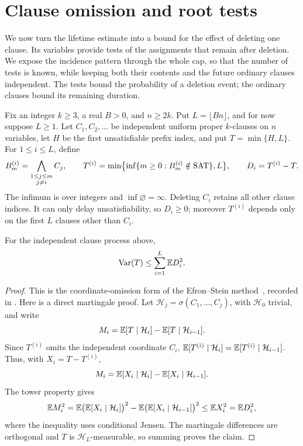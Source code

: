 \section{Clause omission and root tests}
\label{sec:deletion}

We now turn the lifetime estimate into a bound for the effect of
deleting one clause.  Its variables provide tests of the assignments
that remain after deletion.  We expose the incidence pattern through
the whole cap, so that the number of tests is known, while keeping
both their contents and the future ordinary clauses independent.
The tests bound the probability of a deletion event; the ordinary
clauses bound its remaining duration.

Fix an integer \(k\ge3\), a real \(B>0\), and \(n\ge2k\).  Put
\(L=\lfloor Bn\rfloor\), and for now suppose \(L\ge1\).
Let \(C_1,C_2,\ldots\) be independent uniform proper \(k\)-clauses
on \(n\) variables, let \(H\) be the first unsatisfiable prefix index,
and put \(T=\min\{H,L\}\).  For \(1\le i\le L\), define
\[
 B_m^{(i)}=\bigwedge_{\substack{1\le j\le m\\j\ne i}}C_j,\qquad
 T^{(i)}=\min\bigl\{\inf\{m\ge0:B_m^{(i)}\notin\mathrm{SAT}\},L\bigr\},
 \qquad D_i=T^{(i)}-T.
\]
The infimum is over integers and \(\inf\varnothing=\infty\).
Deleting \(C_i\) retains all other clause indices.  It can only delay
unsatisfiability, so \(D_i\ge0\); moreover \(T^{(i)}\) depends only
on the first \(L\) clauses other than \(C_i\).

\begin{lemma}\label{lem:coordinate-omission}
For the independent clause process above,
\begin{equation}\label{eq:coordinate-omission}
 \operatorname{Var}(T)\le\sum_{i=1}^{L}\mathbb E D_i^2.
\end{equation}
\end{lemma}

\begin{proof}
This is the coordinate-omission form of the Efron--Stein
method~\cite{EfronStein}, recorded in
\cite[equation~(3.6)]{BBLM}.  Here is a direct martingale proof.
Let \(\mathcal H_j=\sigma(C_1,\ldots,C_j)\), with \(\mathcal H_0\)
trivial, and write
\[
 M_i=\mathbb E[T\mid\mathcal H_i]-\mathbb E[T\mid\mathcal H_{i-1}].
\]
Since \(T^{(i)}\) omits the independent coordinate \(C_i\),
\(\mathbb E[T^{(i)}\mid\mathcal H_i]
=\mathbb E[T^{(i)}\mid\mathcal H_{i-1}]\).  Thus, with
\(X_i=T-T^{(i)}\),
\[
 M_i=\mathbb E[X_i\mid\mathcal H_i]-\mathbb E[X_i\mid\mathcal H_{i-1}].
\]
The tower property gives
\[
 \mathbb E M_i^2
 =\mathbb E\bigl(\mathbb E[X_i\mid\mathcal H_i]\bigr)^2
  -\mathbb E\bigl(\mathbb E[X_i\mid\mathcal H_{i-1}]\bigr)^2
 \le\mathbb E X_i^2=\mathbb E D_i^2,
\]
where the inequality uses conditional Jensen.  The martingale
differences are orthogonal and \(T\) is \(\mathcal H_L\)-measurable,
so summing proves the claim.
\end{proof}

